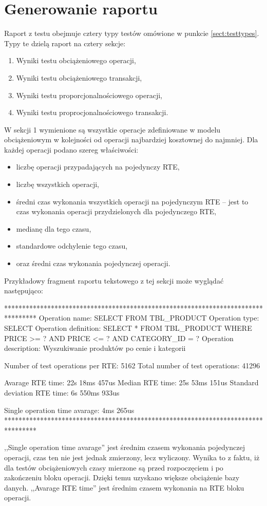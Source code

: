 \section{Generowanie raportu}\label{sect:textraport}
Raport z testu obejmuje cztery typy testów omówione w punkcie \ref{sect:testtypes}.
Typy te dzielą raport na cztery sekcje:
\begin{enumerate}
\item Wyniki testu obciążeniowego operacji,
\item Wyniki testu obciążeniowego transakcji,
\item Wyniki testu proporcjonalnościowego operacji,
\item Wyniki testu proprocjonalnościowego transakcji.
\end{enumerate}
W sekcji 1 wymienione są wszystkie operacje zdefiniowane w modelu obciążeniowym
w kolejności od operacji najbardziej kosztownej do najmniej. Dla każdej operacji 
podano szereg właściwości:
\begin{itemize}
\item liczbę operacji przypadających na pojedynczy RTE,
\item liczbę wszystkich operacji,
\item średni czas wykonania wszystkich operacji na pojedynczym RTE -- jest to czas
wykonania operacji przydzielonych dla pojedynczego RTE,
\item medianę dla tego czasu,
\item standardowe odchylenie tego czasu,
\item oraz średni czas wykonania pojedynczej operacji.
\end{itemize}
Przykładowy fragment raportu tekstowego z tej sekcji może wyglądać następująco:
\begin{codeblock}
*********************************************************************************
Operation name: SELECT FROM TBL_PRODUCT
Operation type: SELECT
Operation definition:  SELECT * FROM TBL_PRODUCT WHERE PRICE >= ? AND PRICE <= ? AND CATEGORY_ID = ?
Operation description: Wyszukiwanie produktów po cenie i kategorii

Number of test operations per RTE:  5162
Total number of test operations:    41296

Avarage RTE time:               22s 18ms 457us
Median RTE time:                25s 53ms 151us
Standard deviation RTE time:    6s 550ms 933us

Single operation time avarage:  4ms 265us
*********************************************************************************
\end{codeblock}
,,Single operation time avarage'' jest średnim czasem wykonania pojedynczej operacji, czas ten nie jest jednak zmierzony,
lecz wyliczony. Wynika to z faktu, iż dla testów obciążeniowych czasy mierzone są przed rozpoczęciem i po zakończeniu
bloku operacji. Dzięki temu uzyskano większe obciążenie bazy danych. ,,Avarage RTE time'' jest średnim czasem wykonania na RTE
bloku operacji.

